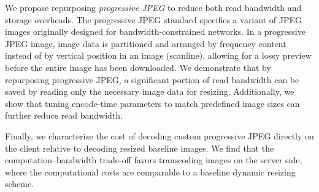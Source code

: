 We propose repurposing \emph{progressive JPEG} to reduce both read bandwidth and storage overheads.
%
The progressive JPEG standard specifies a variant of JPEG images originally designed for bandwidth-constrained networks.
In a progressive JPEG image, image data is partitioned and arranged by frequency content instead of by vertical position in an image (scanline), allowing for a lossy preview before the entire image has been downloaded.
We demonstrate that by repurposing progressive JPEG, a significant portion of read bandwidth can be saved by reading only the necessary image data for resizing.
Additionally, we show that tuning encode-time parameters to match predefined image sizes can further reduce read bandwidth.

Finally, we characterize the cost of decoding custom progressive JPEG directly on the client relative to decoding resized baseline images. 
We find that the computation--bandwidth trade-off favors transcoding images on the server side, where the computational costs are comparable to a baseline dynamic resizing scheme.
